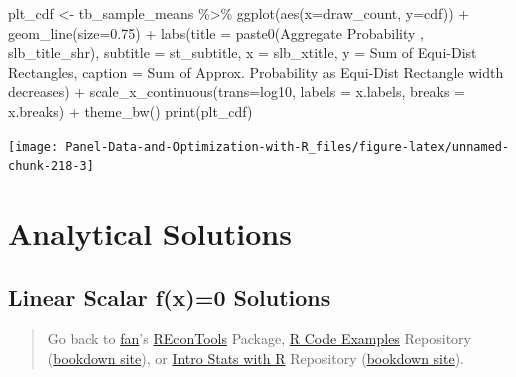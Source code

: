 \documentclass[
]{book}
\newenvironment{Shaded}{\begin{snugshade}}{\end{snugshade}}
\newcommand{\AttributeTok}[1]{\textcolor[rgb]{0.77,0.63,0.00}{#1}}
\newcommand{\FloatTok}[1]{\textcolor[rgb]{0.00,0.00,0.81}{#1}}
\newcommand{\FunctionTok}[1]{\textcolor[rgb]{0.00,0.00,0.00}{#1}}
\newcommand{\NormalTok}[1]{#1}
\newcommand{\OtherTok}[1]{\textcolor[rgb]{0.56,0.35,0.01}{#1}}
\newcommand{\SpecialCharTok}[1]{\textcolor[rgb]{0.00,0.00,0.00}{#1}}
\newcommand{\StringTok}[1]{\textcolor[rgb]{0.31,0.60,0.02}{#1}}
\begin{document}
\begin{Shaded}
\begin{Highlighting}[]
\NormalTok{plt\_cdf }\OtherTok{\textless{}{-}}\NormalTok{ tb\_sample\_means }\SpecialCharTok{\%\textgreater{}\%}
  \FunctionTok{ggplot}\NormalTok{(}\FunctionTok{aes}\NormalTok{(}\AttributeTok{x=}\NormalTok{draw\_count, }\AttributeTok{y=}\NormalTok{cdf)) }\SpecialCharTok{+}
  \FunctionTok{geom\_line}\NormalTok{(}\AttributeTok{size=}\FloatTok{0.75}\NormalTok{) }\SpecialCharTok{+}
  \FunctionTok{labs}\NormalTok{(}\AttributeTok{title =} \FunctionTok{paste0}\NormalTok{(}\StringTok{\textquotesingle{}Aggregate Probability \textquotesingle{}}\NormalTok{, slb\_title\_shr),}
       \AttributeTok{subtitle =}\NormalTok{ st\_subtitle,}
       \AttributeTok{x =}\NormalTok{ slb\_xtitle,}
       \AttributeTok{y =} \StringTok{\textquotesingle{}Sum of Equi{-}Dist Rectangles\textquotesingle{}}\NormalTok{,}
       \AttributeTok{caption =} \StringTok{\textquotesingle{}Sum of Approx. Probability as Equi{-}Dist Rectangle width decreases\textquotesingle{}}\NormalTok{) }\SpecialCharTok{+}
  \FunctionTok{scale\_x\_continuous}\NormalTok{(}\AttributeTok{trans=}\StringTok{\textquotesingle{}log10\textquotesingle{}}\NormalTok{, }\AttributeTok{labels =}\NormalTok{ x.labels, }\AttributeTok{breaks =}\NormalTok{ x.breaks) }\SpecialCharTok{+}
  \FunctionTok{theme\_bw}\NormalTok{()}
\FunctionTok{print}\NormalTok{(plt\_cdf)}
\end{Highlighting}
\end{Shaded}

\begin{center}\texttt{[image: Panel-Data-and-Optimization-with-R\_files/figure-latex/unnamed-chunk-218-3]} \end{center}

\hypertarget{analytical-solutions}{%
\section{Analytical Solutions}\label{analytical-solutions}}

\hypertarget{linear-scalar-fx0-solutions}{%
\subsection{Linear Scalar f(x)=0 Solutions}\label{linear-scalar-fx0-solutions}}

\begin{quote}
Go back to \href{http://fanwangecon.github.io/}{fan}'s \href{https://fanwangecon.github.io/REconTools/}{REconTools} Package, \href{https://fanwangecon.github.io/R4Econ/}{R Code Examples} Repository (\href{https://fanwangecon.github.io/R4Econ/bookdown}{bookdown site}), or \href{https://fanwangecon.github.io/Stat4Econ/}{Intro Stats with R} Repository (\href{https://fanwangecon.github.io/Stat4Econ/bookdown}{bookdown site}).
\end{quote}
\end{document}
